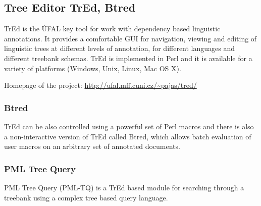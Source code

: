 %

\subsection{Tree Editor TrEd, Btred}

TrEd is the ÚFAL key tool for work with dependency based linguistic annotations. It provides a comfortable GUI for navigation, viewing and editing of linguistic trees at different levels of annotation, for different languages and different treebank schemas. TrEd is implemented in Perl and it is available for a variety of platforms (Windows, Unix, Linux, Mac OS X).

\medskip
Homepage of the project: \url{http://ufal.mff.cuni.cz/~pajas/tred/}


\subsubsection{Btred}
TrEd can be also controlled using a powerful set of Perl macros and there is also a non-interactive version of TrEd called Btred, which allows batch evaluation of user macros on an arbitrary set of annotated documents.

\subsubsection{PML Tree Query} \label{sec:ch30_pml_tree_query}
PML Tree Query (PML-TQ) \citep{biblio:PaStSystemfor2009} is a TrEd based module for searching through a treebank using a complex tree based query language.

